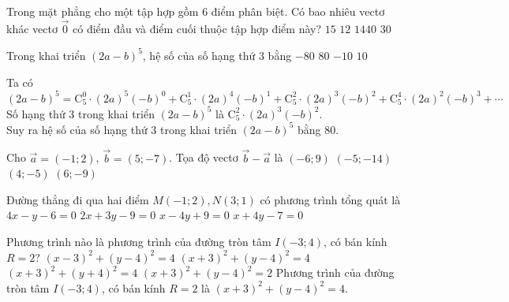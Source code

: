 \begin{ex}%
Trong mặt phẳng cho một tập hợp gồm $ 6 $ điểm phân biệt. Có bao nhiêu vectơ khác vectơ $ \overrightarrow{0} $ có điểm đầu và điểm cuối thuộc tập hợp điểm này?
\choice
{$ 15 $}
{$ 12 $}
{$ 1440 $}
{\True $ 30 $}
\end{ex}

\begin{ex}%
Trong khai triển $(2 a-b)^5$, hệ số của số hạng thứ $3$ bằng
\choice
{$-80$}
{\True $80$}
{$-10$}
{$10$}
\loigiai
{Ta có $(2 a-b)^5=\mathrm{C}_5^0\cdot \left(2a\right)^5(-b)^0+\mathrm{C}_5^1\cdot \left(2a\right)^4(-b)^1+\mathrm{C}_5^2\cdot \left(2a\right)^3(-b)^2+\mathrm{C}_5^4\cdot \left(2a\right)^2(-b)^3+\cdots$\\
Số hạng thứ $3$ trong khai triển $(2 a-b)^5$ là $\mathrm{C}_5^2\cdot \left(2a\right)^3(-b)^2$.\\
Suy ra hệ số của số hạng thứ $3$ trong khai triển $(2 a-b)^5$ bằng $80$.

}
\end{ex}

\begin{ex}%
Cho $\overrightarrow{a}=(-1;2)$, $\overrightarrow{b}=(5;-7)$. Tọa độ vectơ $\overrightarrow{b}-\overrightarrow{a}$ là
\choice
{$(-6;9)$}
{$(-5;-14)$}
{$(4;-5)$}
{\True $(6;-9)$}
\end{ex}

\begin{ex} %
Đường thẳng đi qua hai điểm $M(-1 ; 2), N(3 ; 1)$ có phương trình tổng quát là
\choice
{$4 x-y-6=0$}
{$2 x+3 y-9=0$}
{$x-4 y+9=0$}
{\True $x+4 y-7=0$}
\end{ex}

\begin{ex}%
Phương trình nào là phương trình của đường tròn tâm $I(-3;4)$, có bán kính $R=2$?
\choice
{$\left(x-3\right)^2+\left(y-4\right)^2=4$}
{\True $\left(x+3\right)^2+\left(y-4\right)^2=4$}
{$\left(x+3\right)^2+\left(y+4\right)^2=4$}
{$\left(x+3\right)^2+\left(y-4\right)^2=2$}
\loigiai
{
Phương trình của đường tròn tâm $I(-3;4)$, có bán kính $R=2$ là $\left(x+3\right)^2+\left(y-4\right)^2=4$.
}
\end{ex}

